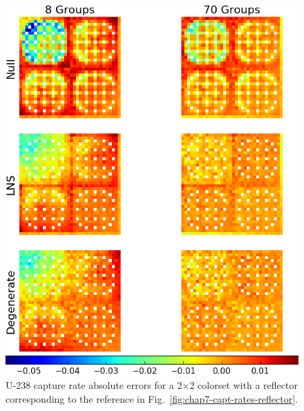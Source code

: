 \begin{appendices}
\begin{figure}[h!]
\centering
\includegraphics[width=\linewidth]{figures/patterns/appendix/reflector/capt-err}
\vspace{2mm}
\caption[U-238 capture rate absolute errors for a 2$\times$2 colorset with a reflector]{U-238 capture rate absolute errors for a 2$\times$2 colorset with a reflector corresponding to the reference in Fig.~\ref{fig:chap7-capt-rates-reflector}.}
\label{fig:lns-reflector-capt-err-abs}
\end{figure}

\clearpage


\end{appendices}
